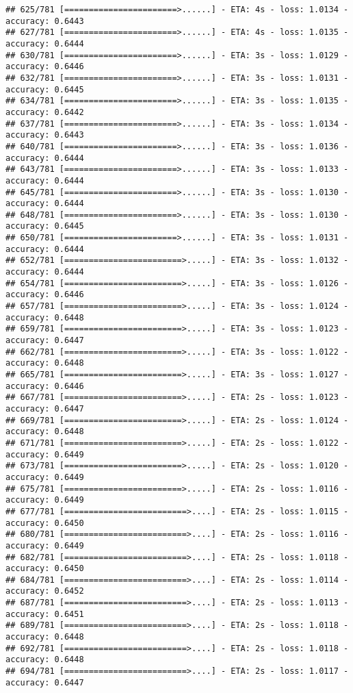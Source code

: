 \documentclass[
]{article}
\begin{document}
\begin{verbatim}
## 625/781 [=======================>......] - ETA: 4s - loss: 1.0134 - accuracy: 0.6443
## 627/781 [=======================>......] - ETA: 4s - loss: 1.0135 - accuracy: 0.6444
## 630/781 [=======================>......] - ETA: 3s - loss: 1.0129 - accuracy: 0.6446
## 632/781 [=======================>......] - ETA: 3s - loss: 1.0131 - accuracy: 0.6445
## 634/781 [=======================>......] - ETA: 3s - loss: 1.0135 - accuracy: 0.6442
## 637/781 [=======================>......] - ETA: 3s - loss: 1.0134 - accuracy: 0.6443
## 640/781 [=======================>......] - ETA: 3s - loss: 1.0136 - accuracy: 0.6444
## 643/781 [=======================>......] - ETA: 3s - loss: 1.0133 - accuracy: 0.6444
## 645/781 [=======================>......] - ETA: 3s - loss: 1.0130 - accuracy: 0.6444
## 648/781 [=======================>......] - ETA: 3s - loss: 1.0130 - accuracy: 0.6445
## 650/781 [=======================>......] - ETA: 3s - loss: 1.0131 - accuracy: 0.6444
## 652/781 [========================>.....] - ETA: 3s - loss: 1.0132 - accuracy: 0.6444
## 654/781 [========================>.....] - ETA: 3s - loss: 1.0126 - accuracy: 0.6446
## 657/781 [========================>.....] - ETA: 3s - loss: 1.0124 - accuracy: 0.6448
## 659/781 [========================>.....] - ETA: 3s - loss: 1.0123 - accuracy: 0.6447
## 662/781 [========================>.....] - ETA: 3s - loss: 1.0122 - accuracy: 0.6448
## 665/781 [========================>.....] - ETA: 3s - loss: 1.0127 - accuracy: 0.6446
## 667/781 [========================>.....] - ETA: 2s - loss: 1.0123 - accuracy: 0.6447
## 669/781 [========================>.....] - ETA: 2s - loss: 1.0124 - accuracy: 0.6448
## 671/781 [========================>.....] - ETA: 2s - loss: 1.0122 - accuracy: 0.6449
## 673/781 [========================>.....] - ETA: 2s - loss: 1.0120 - accuracy: 0.6449
## 675/781 [========================>.....] - ETA: 2s - loss: 1.0116 - accuracy: 0.6449
## 677/781 [=========================>....] - ETA: 2s - loss: 1.0115 - accuracy: 0.6450
## 680/781 [=========================>....] - ETA: 2s - loss: 1.0116 - accuracy: 0.6449
## 682/781 [=========================>....] - ETA: 2s - loss: 1.0118 - accuracy: 0.6450
## 684/781 [=========================>....] - ETA: 2s - loss: 1.0114 - accuracy: 0.6452
## 687/781 [=========================>....] - ETA: 2s - loss: 1.0113 - accuracy: 0.6451
## 689/781 [=========================>....] - ETA: 2s - loss: 1.0118 - accuracy: 0.6448
## 692/781 [=========================>....] - ETA: 2s - loss: 1.0118 - accuracy: 0.6448
## 694/781 [=========================>....] - ETA: 2s - loss: 1.0117 - accuracy: 0.6447

\end{verbatim}
\end{document}
